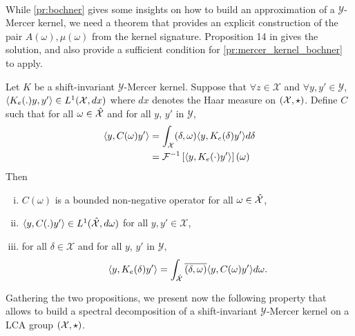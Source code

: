 \paragraph{}
While \cref{pr:bochner} gives some insights on how to build an approximation of a $\mathcal{Y}$-Mercer kernel, we need a theorem that provides an explicit construction of the pair $A(\omega), \mu(\omega)$ from the kernel signature. Proposition 14 in \citet{Carmeli2010} gives the solution, and also provide a sufficient condition for \cref{pr:mercer_kernel_bochner} to apply.
\begin{proposition}
\label{pr:inverse_ovk_Fourier_decomposition}
Let $K$ be a shift-invariant $\mathcal{Y}$-Mercer kernel. %
Suppose that $\forall z \in \mathcal{X}$ and $\forall y ,y' \in\mathcal{Y}$, $\langle K_e(.)y,y'\rangle\in L^1(\mathcal{X},dx)$ where $dx$ denotes the Haar measure on $(\mathcal{X}, \star)$. %
Define $C$ such that for all $\omega \in \hat{\mathcal{X}}$ and for all $y$, $y'$ in $\mathcal{Y}$,
\begin{equation}\label{eq:CK0}
\begin{aligned}
\langle y,C(\omega)y'\rangle &= \int_{\mathcal{X}} (\delta, \omega)\langle y, K_e(\delta)y'\rangle d\delta \\
	&=\mathcal{F}^{-1}\left[\langle y, K_e(\cdot)y'\rangle\right](\omega)
\end{aligned}
\end{equation} %
Then
\begin{enumerate}[i)]
\item $C(\omega)$ is a bounded non-negative operator for all $\omega \in \hat{\mathcal{X}}$,
\item $\langle y, C(.)y'\rangle\in L^1(\hat{\mathcal{X}},d\omega)$ for all $y,y'\in\mathcal{X}$,
\item for all $\delta\in\mathcal{X}$ and for all $y$, $y'$ in $\mathcal{Y}$,
\begin{equation*}
\langle y, K_e(\delta)y'\rangle= \int_{\hat{\mathcal{X}}}\overline{(\delta,\omega)}\langle y, C(\omega)y'\rangle d\omega.
\end{equation*} %
\end{enumerate}
\end{proposition} %
Gathering the two propositions, we present now the following property that allows to build a spectral decomposition of a shift-invariant $\mathcal{Y}$-Mercer kernel on a \acs{LCA} group $(\mathcal{X},\star)$.
